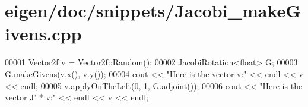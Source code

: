 \hypertarget{eigen_2doc_2snippets_2_jacobi__make_givens_8cpp_source}{}\section{eigen/doc/snippets/\+Jacobi\+\_\+make\+Givens.cpp}
\label{eigen_2doc_2snippets_2_jacobi__make_givens_8cpp_source}

\begin{DoxyCode}
00001 Vector2f v = Vector2f::Random();
00002 JacobiRotation<float> G;
00003 G.makeGivens(v.x(), v.y());
00004 cout << \textcolor{stringliteral}{"Here is the vector v:"} << endl << v << endl;
00005 v.applyOnTheLeft(0, 1, G.adjoint());
00006 cout << \textcolor{stringliteral}{"Here is the vector J' * v:"} << endl << v << endl;
\end{DoxyCode}
